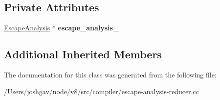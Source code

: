 \subsection*{Private Attributes}
\begin{DoxyCompactItemize}
\item 
\hyperlink{classv8_1_1internal_1_1compiler_1_1_escape_analysis}{Escape\+Analysis} $\ast$ {\bfseries escape\+\_\+analysis\+\_\+}\hypertarget{classv8_1_1internal_1_1compiler_1_1_escape_analysis_verifier_a294a53d2c8bd1846ed6459c37ebc28e9}{}\label{classv8_1_1internal_1_1compiler_1_1_escape_analysis_verifier_a294a53d2c8bd1846ed6459c37ebc28e9}

\end{DoxyCompactItemize}
\subsection*{Additional Inherited Members}


The documentation for this class was generated from the following file\+:\begin{DoxyCompactItemize}
\item 
/\+Users/joshgav/node/v8/src/compiler/escape-\/analysis-\/reducer.\+cc\end{DoxyCompactItemize}
